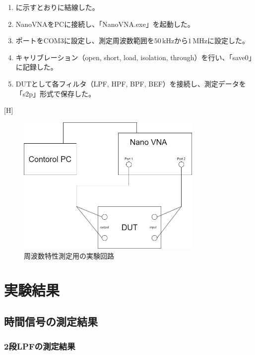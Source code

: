 \documentclass[11pt,dvipdfmx]{jarticle}
\begin{document}
\begin{enumerate}
  \item {}に示すとおりに結線した。
  \item NanoVNAをPCに接続し、「NanoVNA.exe」を起動した。
  \item ポートをCOM3に設定し、測定周波数範囲を$50\,\mathrm{kHz}$から$1\,\mathrm{MHz}$に設定した。
  \item キャリブレーション（open, short, load, isolation, through）を行い、「save0」に記録した。
  \item DUTとして各フィルタ（LPF, HPF, BPF, BEF）を接続し、測定データを「s2p」形式で保存した。
\end{enumerate}[H]
\begin{figure}
  \centering
  \includegraphics[width=0.8\textwidth]{fig/VNA.drawio.png}
  \caption{周波数特性測定用の実験回路}
  \label{fig:実験回路2}
\end{figure}

\section{実験結果}
\subsection{時間信号の測定結果}

\subsubsection{2段LPFの測定結果}
\end{document}
